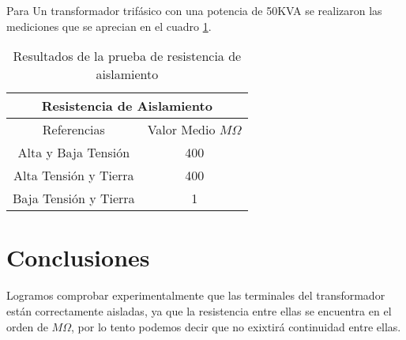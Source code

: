 \documentclass[]{article}
\begin{document}
    Para Un transformador trifásico con una potencia de 50KVA se realizaron las mediciones que se aprecian en el cuadro \ref{ultimo}.\\
    
    \begin{table}[h!]\footnotesize
    	\caption{Resultados de la prueba de resistencia de aislamiento}
    	\centering
    	\begin{tabular}{ |c|c| }
    		\hline
    		\multicolumn{2}{|c|}{Resistencia de Aislamiento} \\
    		\hline
    		Referencias & Valor Medio $M \Omega$  \\
    		\hline
    		Alta y Baja Tensión & 400 \\
    		\hline
    		Alta Tensión y Tierra & 400  \\
    		\hline
    		Baja Tensión y Tierra & 1  \\
    		\hline
    	\end{tabular}
    	\label{ultimo}
    \end{table}
    
	
	\section{Conclusiones}
	
Logramos comprobar experimentalmente que las terminales del transformador están correctamente aisladas, ya que la resistencia entre ellas se encuentra en el orden de $M \Omega$, por lo tento podemos decir que no exixtirá continuidad entre ellas.
	

    


	
	
\end{document}
